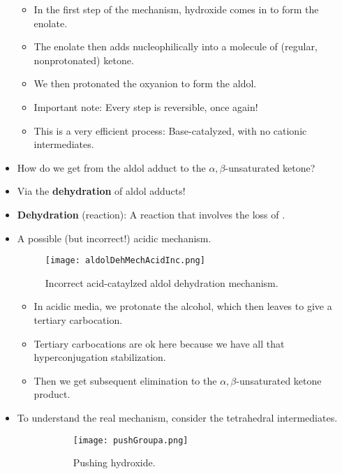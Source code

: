 \documentclass[../notes.tex]{subfiles}
\begin{document}
\begin{itemize}
\begin{itemize}
        \item In the first step of the mechanism, hydroxide comes in to form the enolate.
        \item The enolate then adds nucleophilically into a molecule of (regular, nonprotonated) ketone.
        \item We then protonated the oxyanion to form the aldol.
        \item Important note: Every step is reversible, once again!
        \item This is a very efficient process: Base-catalyzed, with no cationic intermediates.
    \end{itemize}
    \item How do we get from the aldol adduct to the $\alpha,\beta$-unsaturated ketone?
    \item Via the \textbf{dehydration} of aldol adducts!
    \item \textbf{Dehydration} (reaction): A reaction that involves the loss of .
    \item A possible (but incorrect!) acidic mechanism.
    \begin{figure}[h!]
        \centering
        \texttt{[image: aldolDehMechAcidInc.png]}
        \caption{Incorrect acid-cataylzed aldol dehydration mechanism.}
        \label{fig:aldolDehMechAcidInc}
    \end{figure}
    \begin{itemize}
        \item In acidic media, we protonate the alcohol, which then leaves to give a tertiary carbocation.
        \item Tertiary carbocations are ok here because we have all that hyperconjugation stabilization.
        \item Then we get subsequent elimination to the $\alpha,\beta$-unsaturated ketone product.
    \end{itemize}
    \item To understand the real mechanism, consider the tetrahedral intermediates.
    \begin{figure}[h!]
        \centering
        \begin{subfigure}[b]{0.37\linewidth}
            \centering
            \texttt{[image: pushGroupa.png]}
            \caption{Pushing hydroxide.}
            \label{fig:pushGroupa}
        \end{subfigure}
        \begin{subfigure}[b]{0.37\linewidth}

\end{subfigure}
\end{figure}
\end{itemize}
\end{document}
